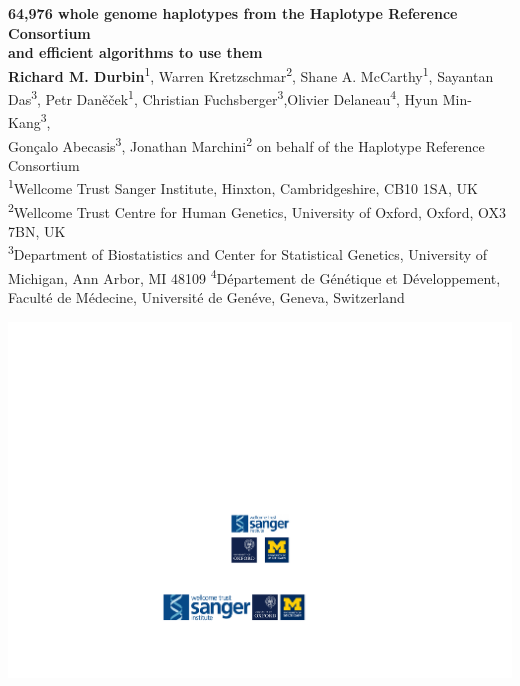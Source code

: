 \documentclass[a0,landscape]{a0poster}
\begin{document}

\begin{minipage}[b]{0.80\linewidth}
\veryHuge \color{sangertext} \textbf{64,976 whole genome haplotypes from the Haplotype Reference Consortium\\and efficient algorithms to use them} \color{sangersubtitletext}\\ %
\Large \color{black} \textbf{Richard M. Durbin}\textsuperscript{1}, Warren Kretzschmar\textsuperscript{2}, Shane A. McCarthy\textsuperscript{1}, Sayantan Das\textsuperscript{3}, Petr Dan\v{e}\v{c}ek\textsuperscript{1}, Christian Fuchsberger\textsuperscript{3},Olivier Delaneau\textsuperscript{4}, Hyun Min-Kang\textsuperscript{3},\\Gon\c{c}alo Abecasis\textsuperscript{3}, Jonathan Marchini\textsuperscript{2} on behalf of the Haplotype Reference Consortium\\[0.cm] %
\large \textsuperscript{1}Wellcome Trust Sanger Institute, Hinxton, Cambridgeshire, CB10 1SA, UK
       \textsuperscript{2}Wellcome Trust Centre for Human Genetics, University of Oxford, Oxford, OX3 7BN, UK\\
       \textsuperscript{3}Department of Biostatistics and Center for Statistical Genetics, University of Michigan, Ann Arbor, MI 48109
       \textsuperscript{4}D\'{e}partement de G\'{e}n\'{e}tique et D\'{e}veloppement, Facult\'{e} de M\'{e}decine, Universit\'{e} de Gen\'{e}ve, Geneva, Switzerland\\[0.4cm]
\end{minipage}
\hspace{-4cm}
\begin{minipage}[b]{0.35\linewidth}
\includegraphics[width=24cm]{images/logos2.pdf}\\
\vspace{2.5cm}
\end{minipage}
\end{document}
